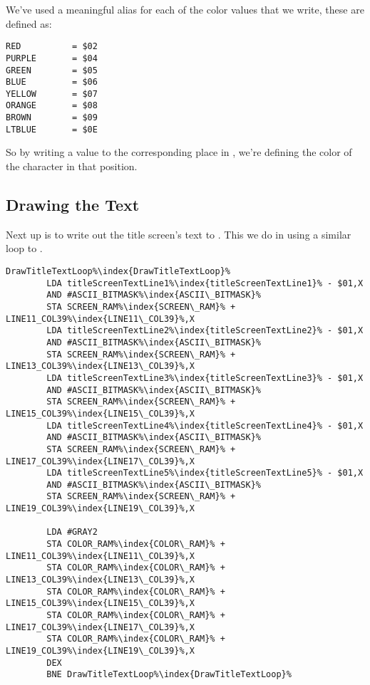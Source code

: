 We've used a meaningful alias for each of the color values that we write, these are defined as:

\begin{lstlisting}[caption=In \icode{DrawStripesBehindTitle\index{DrawStripesBehindTitle}},escapechar=\%]
RED          = $02
PURPLE       = $04
GREEN        = $05
BLUE         = $06
YELLOW       = $07
ORANGE       = $08
BROWN        = $09
LTBLUE       = $0E
\end{lstlisting}

So by writing a value to the corresponding place in , we're defining the color of the character
in that position.



\subsection{Drawing the Text}

Next up is to write out the title screen's text to . This we do in 
using a similar loop to . 

\begin{lstlisting}[caption=In \icode{DrawTitleScreenText\index{DrawTitleScreenText}},escapechar=\%]
DrawTitleTextLoop%\index{DrawTitleTextLoop}%   
        LDA titleScreenTextLine1%\index{titleScreenTextLine1}% - $01,X
        AND #ASCII_BITMASK%\index{ASCII\_BITMASK}%
        STA SCREEN_RAM%\index{SCREEN\_RAM}% + LINE11_COL39%\index{LINE11\_COL39}%,X
        LDA titleScreenTextLine2%\index{titleScreenTextLine2}% - $01,X
        AND #ASCII_BITMASK%\index{ASCII\_BITMASK}%
        STA SCREEN_RAM%\index{SCREEN\_RAM}% + LINE13_COL39%\index{LINE13\_COL39}%,X
        LDA titleScreenTextLine3%\index{titleScreenTextLine3}% - $01,X
        AND #ASCII_BITMASK%\index{ASCII\_BITMASK}%
        STA SCREEN_RAM%\index{SCREEN\_RAM}% + LINE15_COL39%\index{LINE15\_COL39}%,X
        LDA titleScreenTextLine4%\index{titleScreenTextLine4}% - $01,X
        AND #ASCII_BITMASK%\index{ASCII\_BITMASK}%
        STA SCREEN_RAM%\index{SCREEN\_RAM}% + LINE17_COL39%\index{LINE17\_COL39}%,X
        LDA titleScreenTextLine5%\index{titleScreenTextLine5}% - $01,X
        AND #ASCII_BITMASK%\index{ASCII\_BITMASK}%
        STA SCREEN_RAM%\index{SCREEN\_RAM}% + LINE19_COL39%\index{LINE19\_COL39}%,X

        LDA #GRAY2
        STA COLOR_RAM%\index{COLOR\_RAM}% + LINE11_COL39%\index{LINE11\_COL39}%,X
        STA COLOR_RAM%\index{COLOR\_RAM}% + LINE13_COL39%\index{LINE13\_COL39}%,X
        STA COLOR_RAM%\index{COLOR\_RAM}% + LINE15_COL39%\index{LINE15\_COL39}%,X
        STA COLOR_RAM%\index{COLOR\_RAM}% + LINE17_COL39%\index{LINE17\_COL39}%,X
        STA COLOR_RAM%\index{COLOR\_RAM}% + LINE19_COL39%\index{LINE19\_COL39}%,X
        DEX
        BNE DrawTitleTextLoop%\index{DrawTitleTextLoop}%
\end{lstlisting}

